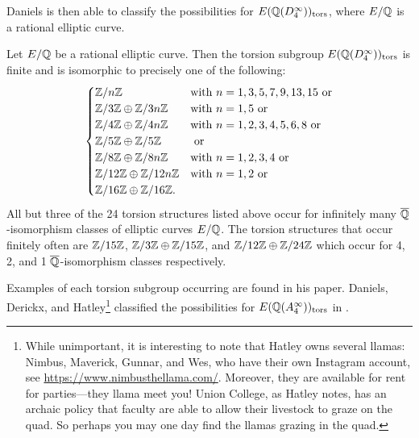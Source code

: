 Daniels is then able to classify the possibilities for $E(\mathbb{Q}(D_4^\infty))_{\text{tors}}$, where $E/\mathbb{Q}$ is a rational elliptic curve. 


\begin{thm}
Let $E/\mathbb{Q}$ be a rational elliptic curve. Then the torsion subgroup $E(\mathbb{Q}(D_4^\infty))_{\text{tors}}$ is finite and is isomorphic to precisely one of the following:
	\[
	\begin{cases}
	\mathbb{Z}/n\mathbb{Z} & \text{with } n= 1, 3, 5, 7, 9, 13, 15 \text{ or} \\
	\mathbb{Z}/3\mathbb{Z} \oplus \mathbb{Z}/3n\mathbb{Z} & \text{with } n= 1,5 \text{ or} \\
	\mathbb{Z}/4\mathbb{Z} \oplus \mathbb{Z}/4n\mathbb{Z} & \text{with } n= 1, 2, 3, 4, 5, 6, 8 \text{ or} \\
	\mathbb{Z}/5\mathbb{Z} \oplus \mathbb{Z}/5\mathbb{Z} & \text{ or} \\
	\mathbb{Z}/8\mathbb{Z} \oplus \mathbb{Z}/8n\mathbb{Z} & \text{with } n= 1, 2, 3, 4 \text{ or} \\
	\mathbb{Z}/12\mathbb{Z} \oplus \mathbb{Z}/12n\mathbb{Z} & \text{with } n= 1, 2 \text{ or} \\
	\mathbb{Z}/16\mathbb{Z} \oplus \mathbb{Z}/16\mathbb{Z}.
	\end{cases}
	\]
All but three of the 24 torsion structures listed above occur for infinitely many $\overline{\mathbb{Q}}$-isomorphism classes of elliptic curves $E/\mathbb{Q}$. The torsion structures that occur finitely often are $\mathbb{Z}/15\mathbb{Z}$, $\mathbb{Z}/3\mathbb{Z} \oplus \mathbb{Z}/15\mathbb{Z}$, and $\mathbb{Z}/12\mathbb{Z} \oplus \mathbb{Z}/24\mathbb{Z}$ which occur for 4, 2, and 1 $\overline{\mathbb{Q}}$-isomorphism classes respectively.
\end{thm}


Examples of each torsion subgroup occurring are found in his paper. Daniels, Derickx, and Hatley\footnote{While unimportant, it is interesting to note that Hatley owns several llamas: Nimbus, Maverick, Gunnar, and Wes, who have their own Instagram account, see \url{https://www.nimbusthellama.com/}. Moreover, they are available for rent for parties---they llama meet you! Union College, as Hatley notes, has an archaic policy that faculty are able to allow their livestock to graze on the quad. So perhaps you may one day find the llamas grazing in the quad.} classified the possibilities for $E(\mathbb{Q}(A_4^\infty))_{\text{tors}}$ in \cite{danielsderickhatley19}. 


